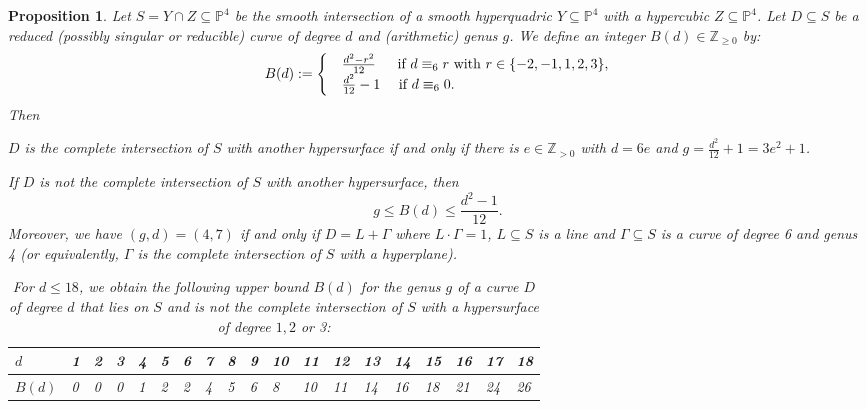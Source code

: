 \documentclass[english,11pt,reqno]{amsart}
\newcommand{\sub}{\subseteq}
\newcommand{\Pfour}{\mathbb{P}^4}
\newcommand{\Z}{\mathbb{Z}}
\newtheorem{prop}[thm]{Proposition}
\begin{document}
\begin{prop} \label{prop:bound_curves_in_K3surface_of_degree_6} 
Let $S=Y\cap Z\sub \Pfour$ be the smooth intersection of a smooth hyperquadric $Y\sub \Pfour$ with a hypercubic $Z\sub \Pfour$. Let $D \sub S$ be a reduced (possibly singular or reducible) curve of degree $d$ and (arithmetic) genus $g$. We define an integer $B(d)\in\Z_{\geq0}$ by:
\begin{equation*} \label{eq:upper_bound_genus_curve_in_K3_surface_degree6}
B(d):= 
\begin{cases}
	&\frac{d^2-r^2}{12} \quad \:\textup{ if } d\equiv_6 r \textup{ with } r\in\{-2,-1,1,2,3\},\\
	&\frac{d^2}{12}-1 \quad \textup{ if } d\equiv_6 0.
\end{cases}
\end{equation*}
Then
\begin{enumprop}
\item $D$ is the complete intersection of $S$ with another hypersurface if and only if there is $e\in \Z_{>0}$ with $d=6e$ and $g=\frac{d^2}{12}+1=3e^2+1$. \label{prop:bound_curves_not_in_K3surface_of_degree_6_mod_0}
\item If $D$ is not the complete intersection of $S$ with another hypersurface, then $$g\leq B(d)\leq \frac{d^2-1}{12}.$$
Moreover, we have $(g,d) = (4,7)$ if and only if $D=L+\Gamma$ where $L\cdot \Gamma=1$, $L\sub S$ is a line and $\Gamma \sub S$ is a curve of degree 6 and genus 4 (or equivalently, $\Gamma$ is the complete intersection of $S$ with a hyperplane). \label{prop:bound_curves_not_in_K3surface_of_degree_6_mod_12345}
\end{enumprop}
%
\begin{table}[H]
\caption{For $d\leq 18$, we obtain the following upper bound $B(d)$ for the genus $g$ of a curve $D$ of degree $d$ that lies on $S$ and is not the complete intersection of $S$ with a hypersurface of degree $1,2$ or 3:}
\label{table:genus_bounds}
\begin{minipage}{\textwidth}
	\centering
	\vspace{0.25cm}
	\begin{tabular}{|l|l|l|l|l|l|l|l|l|l|l|l|l|l|l|l|l|l|l|}
		\hline
		$d$ & 1&2&3&4&5&6&7&8&9&10&11&12&13&14&15&16&17&18\\
		\hline
		$B(d)$ &0&0&0&1&2&2&4&5&6&8&10&11&14&16&18&21&24&26\\
		\hline
	\end{tabular}
\end{minipage}
\end{table}
\end{prop}
\end{document}

